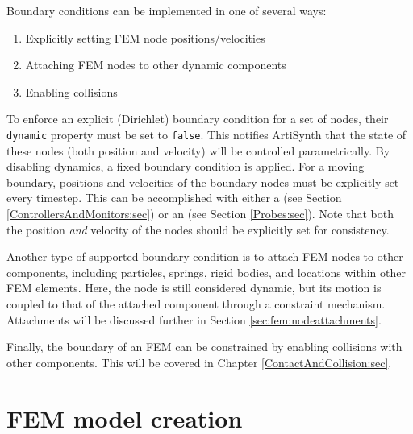 Boundary conditions can be implemented in one of several ways:
\begin{enumerate}
	\item Explicitly setting FEM node positions/velocities
	\item Attaching FEM nodes to other dynamic components
	\item Enabling collisions
\end{enumerate}
To enforce an explicit (Dirichlet) boundary condition for a set of  
nodes, their {\tt dynamic} property must be set to {\tt false}.  This notifies
ArtiSynth that the state of these nodes (both position and velocity) will 
be controlled parametrically.  By disabling dynamics, a fixed 
boundary condition is applied.  For a moving boundary, positions and velocities 
of the boundary nodes must be explicitly set every timestep.  This can be 
accomplished with either a  
(see Section \ref{ControllersAndMonitors:sec}) or an 
 (see Section \ref{Probes:sec}).
Note that both the position \emph{and} velocity of the nodes should be
explicitly set for consistency.

Another type of supported boundary condition is to attach FEM nodes to other
components, including particles, springs, rigid bodies, and locations within
other FEM elements.  Here, the node is still considered dynamic, but its
motion is coupled to that of the attached component through a constraint
mechanism. Attachments will be discussed further in Section 
\ref{sec:fem:nodeattachments}.

Finally, the boundary of an FEM can be constrained by enabling collisions
with other components.  This will be covered in Chapter
\ref{ContactAndCollision:sec}.

\section{FEM model creation}

